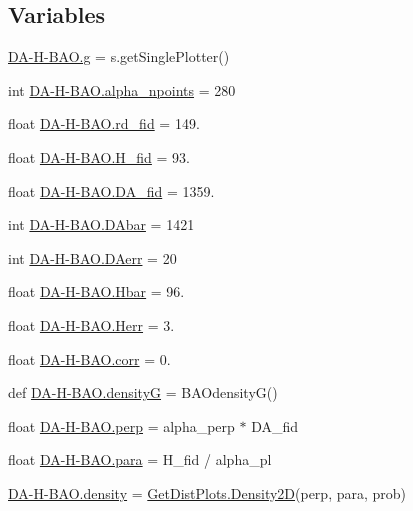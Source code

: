\subsection*{Variables}
\begin{DoxyCompactItemize}
\item 
\mbox{\hyperlink{namespaceDA-H-BAO_a4d5bf2f95a97dc892ed3da689b90966b}{D\+A-\/\+H-\/\+B\+A\+O.\+g}} = s.\+get\+Single\+Plotter()
\item 
int \mbox{\hyperlink{namespaceDA-H-BAO_af0c2ae0bc4a59c068b9ce55eefba82ee}{D\+A-\/\+H-\/\+B\+A\+O.\+alpha\+\_\+npoints}} = 280
\item 
float \mbox{\hyperlink{namespaceDA-H-BAO_a41dacefc2e769d16860b7b1a3d3791bb}{D\+A-\/\+H-\/\+B\+A\+O.\+rd\+\_\+fid}} = 149.
\item 
float \mbox{\hyperlink{namespaceDA-H-BAO_a7e49116209e7af4e96c5a0ceb1040178}{D\+A-\/\+H-\/\+B\+A\+O.\+H\+\_\+fid}} = 93.
\item 
float \mbox{\hyperlink{namespaceDA-H-BAO_ae06900c902984b78a3076f391a5ba380}{D\+A-\/\+H-\/\+B\+A\+O.\+D\+A\+\_\+fid}} = 1359.
\item 
int \mbox{\hyperlink{namespaceDA-H-BAO_a9889d0255b14257eb945adff349f6f26}{D\+A-\/\+H-\/\+B\+A\+O.\+D\+Abar}} = 1421
\item 
int \mbox{\hyperlink{namespaceDA-H-BAO_a813fbee6081aa3b43d0689b0649bc391}{D\+A-\/\+H-\/\+B\+A\+O.\+D\+Aerr}} = 20
\item 
float \mbox{\hyperlink{namespaceDA-H-BAO_af173537092c03b0411d63be083300101}{D\+A-\/\+H-\/\+B\+A\+O.\+Hbar}} = 96.
\item 
float \mbox{\hyperlink{namespaceDA-H-BAO_a75e84f2693834da1615495e7698fd48e}{D\+A-\/\+H-\/\+B\+A\+O.\+Herr}} = 3.
\item 
float \mbox{\hyperlink{namespaceDA-H-BAO_ad41686071450f48b34d929d96c1deaeb}{D\+A-\/\+H-\/\+B\+A\+O.\+corr}} = 0.
\item 
def \mbox{\hyperlink{namespaceDA-H-BAO_a8f4e1fa9290f5d0cfa98586e1450b8d9}{D\+A-\/\+H-\/\+B\+A\+O.\+densityG}} = B\+A\+OdensityG()
\item 
float \mbox{\hyperlink{namespaceDA-H-BAO_a1ef2d11c27ebb2ee813f0915af9e2a4c}{D\+A-\/\+H-\/\+B\+A\+O.\+perp}} = alpha\+\_\+perp $\ast$ D\+A\+\_\+fid
\item 
float \mbox{\hyperlink{namespaceDA-H-BAO_a5e40bd0b44054eb96349908addc6068c}{D\+A-\/\+H-\/\+B\+A\+O.\+para}} = H\+\_\+fid / alpha\+\_\+pl
\item 
\mbox{\hyperlink{namespaceDA-H-BAO_acc09de89f01f6d1a884ce4b151dbc050}{D\+A-\/\+H-\/\+B\+A\+O.\+density}} = \mbox{\hyperlink{classgetdist_1_1densities_1_1Density2D}{Get\+Dist\+Plots.\+Density2D}}(perp, para, prob)

\end{DoxyCompactItemize}
